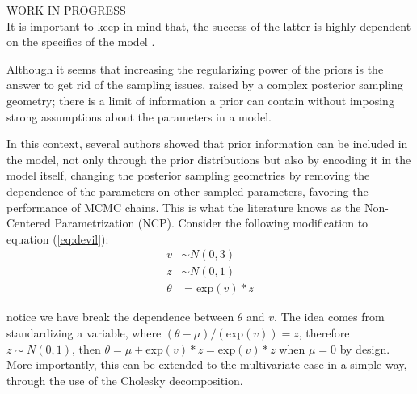 {\color{red} WORK IN PROGRESS \\
	
It is important to keep in mind that, the success of the latter is highly dependent on the specifics of the model \cite{Gelfand_et_al_1995, Gelfand_et_al_1996, Papaspiliopoulos_et_al_2003, Papaspiliopoulos_et_al_2007, Betancourt_et_al_2013, Gorinova_et_al_2019}. 
 
Although it seems that increasing the regularizing power of the priors is the answer to get rid of the sampling issues, raised by a complex posterior sampling geometry; there is a limit of information a prior can contain without imposing strong assumptions about the parameters in a model.

In this context, several authors \cite{Gelfand_et_al_1995, Gelfand_et_al_1996, Papaspiliopoulos_et_al_2003, Papaspiliopoulos_et_al_2007, Betancourt_et_al_2013} showed that prior information can be included in the model, not only through the prior distributions but also by encoding it in the model itself, changing the posterior sampling geometries by removing the dependence of the parameters on other sampled parameters, favoring the performance of MCMC chains. This is what the literature knows as the Non-Centered Parametrization (NCP). Consider the following modification to equation (\ref{eq:devil}):
%
\begin{equation} \label{eq:devil_NC}
	\begin{split}	
		v &\sim N(0, 3) \\
		z &\sim N(0, 1) \\
		\theta &= \text{exp}(v) * z
	\end{split}
\end{equation}

\noindent notice we have break the dependence between $\theta$ and $v$. The idea comes from standardizing a variable, where $(\theta - \mu)/( \text{exp}(v) ) = z$, therefore $z \sim N(0,1)$, then $\theta = \mu + \text{exp}(v) * z = \text{exp}(v) * z$ when $\mu=0$ by design. More importantly, this can be extended to the multivariate case in a simple way, through the use of the Cholesky decomposition.

}
